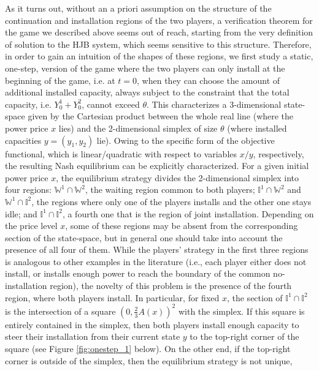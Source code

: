 \documentclass[10pt]{article}
\numberwithin{equation}{section}
\theoremstyle{plain}
\numberwithin{theorem}{section}
\theoremstyle{definition}
\newcommand{\<}{\langle}
\renewcommand{\>}{\rangle}
\renewcommand{\(}{\left(}
\renewcommand{\)}{\right)}
\begin{document}
{As it turns out, without an a priori assumption on the structure of the continuation and installation regions of the two players, a verification theorem for the game we described above seems out of reach, starting from the very definition of solution to the HJB system, which seems sensitive to this structure. Therefore, in order to gain an intuition of %
the shapes of these regions, we first study a static, one-step, version of the game where the two players can only install at the beginning of the game, i.e. at $t=0$, when they can choose the amount of additional installed capacity, always subject to the constraint that the total capacity, i.e. $Y^1_0 + Y^2_0$, cannot exceed $\theta$. 
This characterizes a 3-dimensional state-space given by the Cartesian product between the whole real line (where the power price $x$ lies) and the 2-dimensional simplex of size $\theta$ (where installed capacities $y = (y_1,y_2)$ lie). Owing to the specific form of the objective functional, which is linear/quadratic with respect to variables $x/y$, respectively,
the resulting Nash equilibrium can be explicitly characterized. For a given initial power price $x$, the equilibrium strategy divides the 2-dimensional simplex into four regions: $\mathbb{W}^1\cap \mathbb{W}^2$, the waiting region common to both players; $\mathbb{I}^1\cap \mathbb{W}^2$ and $\mathbb{W}^1\cap \mathbb{I}^2$, the regions where only one of the players installs and the other one stays idle; and $\mathbb{I}^1\cap \mathbb{I}^2$, a fourth one that is the region of joint installation. Depending on the price level $x$, some of these regions may be absent from the corresponding section of the state-space, but in general one should take into account the presence of all four of them. While the players' strategy in the first three regions is analogous to other examples in the literature (i.e., each player either does not install, or installs enough power to reach the boundary of the common no-installation region), the novelty of this problem is the presence of the fourth region, where both players install. In particular, for fixed $x$, the section of $\mathbb{I}^1\cap \mathbb{I}^2$ is the intersection of a square {$( 0 , \frac{2}{3} A(x) )^2$} with the simplex. If this square is entirely contained in the simplex, then both players install enough capacity to steer their installation from their current state $y$ to the top-right corner of the square (see Figure \ref{fig:onestep_1} below). On the other end, if the top-right corner is outside of the simplex, then the equilibrium strategy is not unique, %
}
\end{document}
